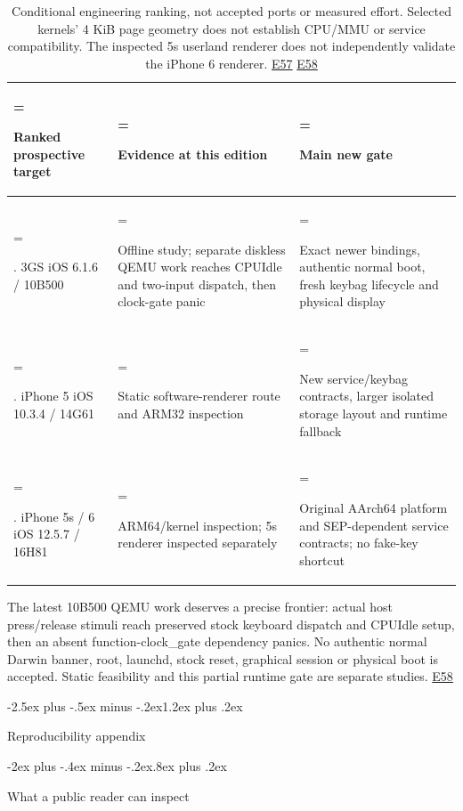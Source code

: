 \documentclass[10pt,letterpaper,twocolumn]{article}
\makeatletter
\renewcommand{\section}{\@startsection{section}{1}{0pt}
  {-2.5ex plus -.5ex minus -.2ex}{1.2ex plus .2ex}
  {\normalfont\large\bfseries\raggedright}}
\renewcommand{\subsection}{\@startsection{subsection}{2}{0pt}
  {-2ex plus -.4ex minus -.2ex}{.8ex plus .2ex}
  {\normalfont\normalsize\bfseries\raggedright}}
\makeatother
\begin{document}
\begin{table}[t]
\centering
\caption[]{Conditional engineering ranking, not accepted ports or measured effort. Selected kernels' 4 KiB page geometry does not establish CPU/MMU or service compatibility. The inspected 5s userland renderer does not independently validate the iPhone 6 renderer. \hyperlink{e-E57}{\textsf{E57}} \hyperlink{e-E58}{\textsf{E58}}}
\label{tab:10}
\setlength{\tabcolsep}{4pt}\renewcommand{\arraystretch}{1.08}
\begin{tabularx}{\linewidth}{@{}>{\hsize=1\hsize\linewidth=\hsize\raggedright\arraybackslash}X>{\hsize=1\hsize\linewidth=\hsize\raggedright\arraybackslash}X>{\hsize=1\hsize\linewidth=\hsize\raggedright\arraybackslash}X@{}}
\toprule
\textbf{Ranked prospective target} & \textbf{Evidence at this edition} & \textbf{Main new gate} \\
\midrule
1. 3GS iOS 6.1.6 / 10B500 & Offline study; separate diskless QEMU work reaches CPUIdle and two-input dispatch, then clock-gate panic & Exact newer bindings, authentic normal boot, fresh keybag lifecycle and physical display \\
2. iPhone 5 iOS 10.3.4 / 14G61 & Static software-renderer route and ARM32 inspection & New service/keybag contracts, larger isolated storage layout and runtime fallback \\
3. iPhone 5s / 6 iOS 12.5.7 / 16H81 & ARM64/kernel inspection; 5s renderer inspected separately & Original AArch64 platform and SEP-dependent service contracts; no fake-key shortcut \\
\bottomrule
\end{tabularx}
\end{table}

The latest 10B500 QEMU work deserves a precise frontier: actual host press/release stimuli reach preserved stock keyboard dispatch and CPUIdle setup, then an absent function-clock\_gate dependency panics. No authentic normal Darwin banner, root, launchd, stock reset, graphical session or physical boot is accepted. Static feasibility and this partial runtime gate are separate studies. \hyperlink{e-E58}{\textsf{E58}}

\section{Reproducibility appendix}

\subsection{What a public reader can inspect}
\end{document}
